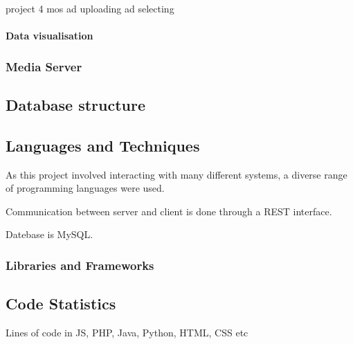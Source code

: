 project 4 mos
ad uploading
ad selecting

\paragraph{Data visualisation}
\subsubsection{Media Server}

\subsection{Database structure}


\subsection{Languages and Techniques}
As this project involved interacting with many different systems, a diverse range of programming languages were used.


Communication between server and client is done through a REST interface.

Datebase is MySQL.


\subsubsection{Libraries and Frameworks}



\subsection{Code Statistics}
Lines of code in JS, PHP, Java, Python, HTML, CSS etc

